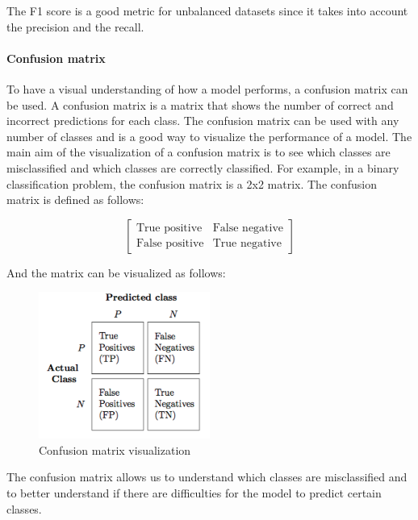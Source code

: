 The F1 score is a good metric for unbalanced datasets since it takes into account the precision and the recall. 

\paragraph*{Confusion matrix}

To have a visual understanding of how a model performs, a confusion matrix can be used. A confusion matrix is a matrix that shows the number of correct and incorrect predictions for each class. The confusion matrix can be used with any number of classes and is a good way to visualize the performance of a model. The main aim of the visualization of a confusion matrix is to see which classes are misclassified and which classes are correctly classified. For example, in a binary classification problem, the confusion matrix is a 2x2 matrix. The confusion matrix is defined as follows:

\begin{equation}
    \begin{bmatrix}
        \text{True positive} & \text{False negative} \\
        \text{False positive} & \text{True negative}
    \end{bmatrix}
\end{equation}

And the matrix can be visualized as follows:

\begin{figure}[H]
    \centering
    \includegraphics[width=0.5\textwidth]{images/confusion_matrix_example.png}
    \caption{Confusion matrix visualization}
    \label{fig:confusion_matrix}
\end{figure}

The confusion matrix allows us to understand which classes are misclassified and to better understand if there are difficulties for the model to predict certain classes.


